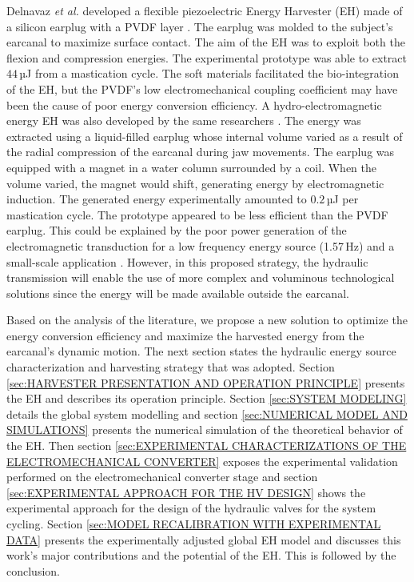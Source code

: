 \documentclass[3p,twocolumn,preprint]{elsarticle}
\begin{document}
Delnavaz \emph{et al.} developed a flexible piezoelectric Energy Harvester (EH) made of a silicon earplug with a PVDF layer \cite{Delnavaz2013}. The earplug was molded to the subject's earcanal to maximize surface contact. The aim of the EH was to exploit both the flexion and compression energies. The experimental prototype was able to extract $44$\,µJ from a mastication cycle. The soft materials facilitated the bio-integration of the EH, but the PVDF's low electromechanical coupling coefficient may have been the cause of poor energy conversion efficiency. A hydro-electromagnetic energy EH was also developed by the same researchers \cite{Delnavaz2012}. The energy was extracted using a liquid-filled earplug whose internal volume varied as a result of the radial compression of the earcanal during jaw movements. The earplug was equipped with a magnet in a water column surrounded by a coil. When the volume varied, the magnet would shift, generating energy by electromagnetic induction. The generated energy experimentally amounted to $0.2$\,µJ per mastication cycle. The prototype appeared to be less efficient than the PVDF earplug. This could be explained by the poor power generation of the electromagnetic transduction for a low frequency energy source (1.57\,Hz) and a small-scale application \cite{Kulah2008,Priya2017}. However, in this proposed strategy, the hydraulic transmission will enable the use of more complex and voluminous technological solutions since the energy will be made available outside the earcanal.

Based on the analysis of the literature, we propose a new solution to optimize the energy conversion efficiency and maximize the harvested energy from the earcanal's dynamic motion. The next section states the hydraulic energy source characterization and harvesting strategy that was adopted. Section \ref{sec:HARVESTER PRESENTATION AND OPERATION PRINCIPLE} presents the EH and describes its operation principle. Section \ref{sec:SYSTEM MODELING} details the global system modelling and section \ref{sec:NUMERICAL MODEL AND SIMULATIONS} presents the numerical simulation of the theoretical behavior of the EH. Then section \ref{sec:EXPERIMENTAL CHARACTERIZATIONS OF THE ELECTROMECHANICAL CONVERTER} exposes the experimental validation performed on the electromechanical converter stage and section \ref{sec:EXPERIMENTAL APPROACH FOR THE HV DESIGN} shows the experimental approach for the design of the hydraulic valves for the system cycling. Section \ref{sec:MODEL RECALIBRATION WITH EXPERIMENTAL DATA} presents the experimentally adjusted global EH model and discusses this work's major contributions and the potential of the EH. This is followed by the conclusion.
\end{document}
